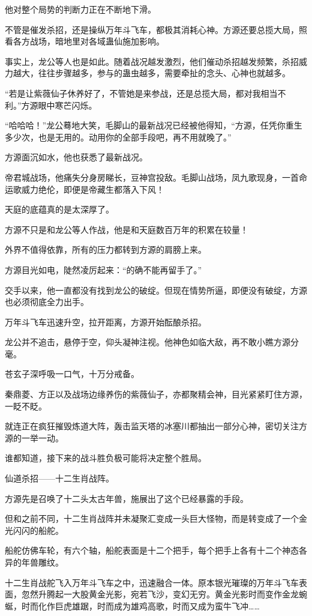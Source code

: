 \begin{this_body}
他对整个局势的判断力正在不断地下滑。

不管是催发杀招，还是操纵万年斗飞车，都极其消耗心神。方源还要总揽大局，照看各方战场，暗地里对各域蛊仙施加影响。

事实上，龙公等人也是如此。随着战况越发激烈，他们催动杀招越发频繁，杀招威力越大，往往步骤越多，参与的蛊虫越多，需要牵扯的念头、心神也就越多。

“若是让紫薇仙子休养好了，不管她是来参战，还是总揽大局，都对我相当不利。”方源眼中寒芒闪烁。

“哈哈哈！”龙公蓦地大笑，毛脚山的最新战况已经被他得知，“方源，任凭你重生多少次，也是无用的。动用你的全部手段吧，再不用就晚了。”

方源面沉如水，他也获悉了最新战况。

帝君城战场，他痛失分身房睇长，豆神宫投敌。毛脚山战场，凤九歌现身，一首命运歌威力绝伦，即便是帝藏生都落入下风！

天庭的底蕴真的是太深厚了。

方源不只是和龙公等人作战，他是和天庭数百万年的积累在较量！

外界不值得依靠，所有的压力都转到方源的肩膀上来。

方源目光如电，陡然凌厉起来：“的确不能再留手了。”

交手以来，他一直都没有找到龙公的破绽。但现在情势所逼，即便没有破绽，方源也必须彻底全力出手。

万年斗飞车迅速升空，拉开距离，方源开始酝酿杀招。

龙公并不追击，悬停于空，仰头凝神注视。他神色如临大敌，再不敢小瞧方源分毫。

苍玄子深呼吸一口气，十万分戒备。

秦鼎菱、方正以及战场边缘养伤的紫薇仙子，亦都聚精会神，目光紧紧盯住方源，一眨不眨。

就连正在疯狂摧毁炼道大阵，轰击监天塔的冰塞川都抽出一部分心神，密切关注方源的一举一动。

谁都知道，接下来的战斗胜负极可能将决定整个胜局。

仙道杀招——十二生肖战阵。

方源先是召唤了十二头太古年兽，施展出了这个已经暴露的手段。

但和之前不同，十二生肖战阵并未凝聚汇变成一头巨大怪物，而是转变成了一个金光闪闪的船舵。

船舵仿佛车轮，有六个轴，船舵表面是十二个把手，每个把手上各有十二个神态各异的年兽雕纹。

十二生肖战舵飞入万年斗飞车之中，迅速融合一体。原本银光璀璨的万年斗飞车表面，忽然升腾起一大股黄金光影，宛若飞沙，变幻无穷。黄金光影时而变作金龙蜿蜒，时而化作巨虎雄踞，时而成为雄鸡高歌，时而又成为蛮牛飞冲……


\end{this_body}
